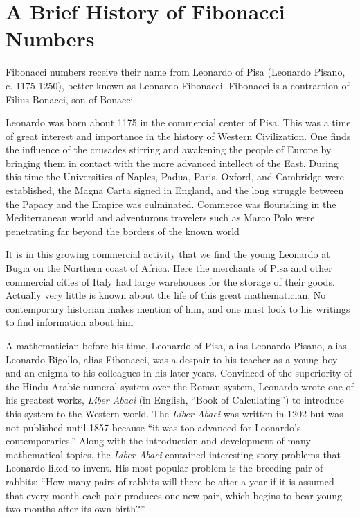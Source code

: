 \documentclass[10pt,]{book}
\theoremstyle{plain}
\theoremstyle{definition}
\theoremstyle{definition}
\numberwithin{equation}{chapter}
\begin{document}
\chapter[{A Brief History of Fibonacci Numbers}]{A Brief History of Fibonacci Numbers}\label{ch_fibs}
\hypertarget{p-3}{}%
Fibonacci numbers receive their name from Leonardo of Pisa (Leonardo Pisano, c. 1175-1250), better known as Leonardo Fibonacci. Fibonacci is a contraction of Filius Bonacci, son of Bonacci%
\par
\hypertarget{p-4}{}%
Leonardo was born about 1175 in the commercial center of Pisa. This was a time of great interest and importance in the history of Western Civilization. One finds the influence of the crusades stirring and awakening the people of Europe by bringing them in contact with the more advanced intellect of the East. During this time the Universities of Naples, Padua, Paris, Oxford, and Cambridge were established, the Magna Carta signed in England, and the long struggle between the Papacy and the Empire was culminated. Commerce was flourishing in the Mediterranean world and adventurous travelers such as Marco Polo were penetrating far beyond the borders of the known world%
\par
\hypertarget{p-5}{}%
It is in this growing commercial activity that we find the young Leonardo at Bugia on the Northern coast of Africa. Here the merchants of Pisa and other commercial cities of Italy had large warehouses for the storage of their goods. Actually very little is known about the life of this great mathematician. No contemporary historian makes mention of him, and one must look to his writings to find information about him%
\par
\hypertarget{p-6}{}%
A mathematician before his time, Leonardo of Pisa, alias Leonardo Pisano, alias Leonardo Bigollo, alias Fibonacci, was a despair to his teacher as a young boy and an enigma to his colleagues in his later years. Convinced of the superiority of the Hindu-Arabic numeral system over the Roman system, Leonardo wrote one of his greatest works, \emph{Liber Abaci} (in English, ``Book of Calculating'') to introduce this system to the Western world. The \emph{Liber Abaci} was written in 1202 but was not published until 1857 because ``it was too advanced for Leonardo's contemporaries.'' Along with the introduction and development of many mathematical topics, the \emph{Liber Abaci} contained interesting story problems that Leonardo liked to invent. His most popular problem is the breeding pair of rabbits: ``How many pairs of rabbits will there be after a year if it is assumed that every month each pair produces one new pair, which begins to bear young two months after its own birth?''%
\end{document}
